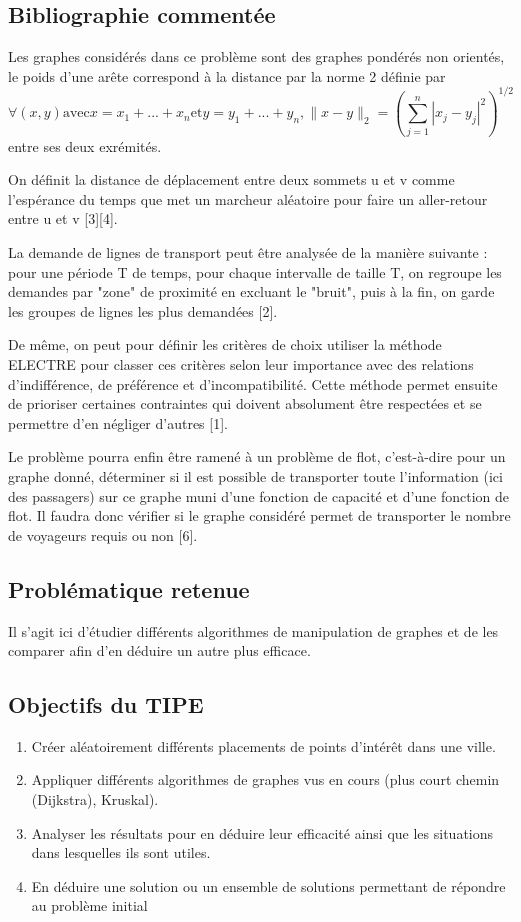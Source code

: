 \documentclass[a4paper,11pt]{article}
\begin{document}
\subsection{Bibliographie commentée}
Les graphes considérés dans ce problème sont des graphes pondérés non orientés, le poids d'une arête correspond à la distance par la norme 2 définie par
$$\forall (x, y) \textrm {avec} x = x_1 + ... + x_n \textrm{et} y = y_1 + ... + y_n, \|x - y\|_2 = \left( {\sum_{j=1}^n{|x_j - y_j|^2}} \right) ^ {1/2}$$
entre ses deux exrémités.

On définit la distance de déplacement entre deux sommets u et v comme l'espérance du temps que met un marcheur aléatoire pour faire un aller-retour entre u et v [3][4].

La demande de lignes de transport peut être analysée de la manière suivante : pour une période T de temps, pour chaque intervalle de taille T, on regroupe les demandes par "zone" de proximité en excluant le "bruit", puis à la fin, on garde les groupes de lignes les plus demandées [2].

De même, on peut pour définir les critères de choix utiliser la méthode ELECTRE pour classer ces critères selon leur importance avec des relations d'indifférence, de préférence et d'incompatibilité. Cette méthode permet ensuite de prioriser certaines contraintes qui doivent absolument être respectées et se permettre d'en négliger d'autres [1].

Le problème pourra enfin être ramené à un problème de flot, c'est-à-dire pour un graphe donné, déterminer si il est possible de transporter toute l'information (ici des passagers) sur ce graphe muni d'une fonction de capacité et d'une fonction de flot. Il faudra donc vérifier si le graphe considéré permet de transporter le nombre de voyageurs requis ou non [6].

\subsection{Problématique retenue}
Il s'agit ici d'étudier différents algorithmes de manipulation de graphes et de les comparer afin d'en déduire un autre plus efficace.
\subsection{Objectifs du TIPE}
\begin{enumerate}
  \item Créer aléatoirement différents placements de points d'intérêt dans une ville.
  \item Appliquer différents algorithmes de graphes vus en cours (plus court chemin (Dijkstra), Kruskal).
  \item Analyser les résultats pour en déduire leur efficacité ainsi que les situations dans lesquelles ils sont utiles.
  \item En déduire une solution ou un ensemble de solutions permettant de répondre au problème initial
\end{enumerate}
\end{document}
